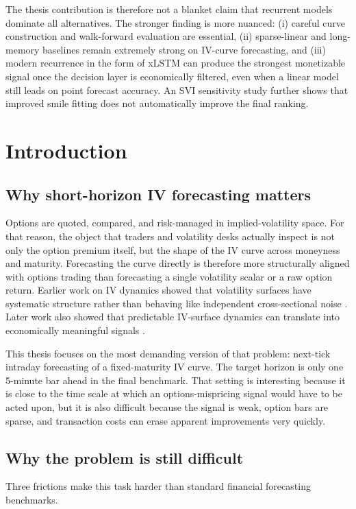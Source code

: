 \documentclass[12pt]{report}
\begin{document}
The thesis contribution is therefore not a blanket claim that recurrent models dominate all alternatives. The stronger finding is more nuanced: (i) careful curve construction and walk-forward evaluation are essential, (ii) sparse-linear and long-memory baselines remain extremely strong on IV-curve forecasting, and (iii) modern recurrence in the form of xLSTM can produce the strongest monetizable signal once the decision layer is economically filtered, even when a linear model still leads on point forecast accuracy. An SVI sensitivity study further shows that improved smile fitting does not automatically improve the final ranking.

\tableofcontents
\clearpage
{}
\hypersetup{pageanchor=true}

\chapter{Introduction}

\section{Why short-horizon IV forecasting matters}
Options are quoted, compared, and risk-managed in implied-volatility space. For that reason, the object that traders and volatility desks actually inspect is not only the option premium itself, but the shape of the IV curve across moneyness and maturity. Forecasting the curve directly is therefore more structurally aligned with options trading than forecasting a single volatility scalar or a raw option return. Earlier work on IV dynamics showed that volatility surfaces have systematic structure rather than behaving like independent cross-sectional noise \citep{cont2002dynamics}. Later work also showed that predictable IV-surface dynamics can translate into economically meaningful signals \citep{bernales2014,borochin2025}.

This thesis focuses on the most demanding version of that problem: next-tick intraday forecasting of a fixed-maturity IV curve. The target horizon is only one 5-minute bar ahead in the final benchmark. That setting is interesting because it is close to the time scale at which an options-mispricing signal would have to be acted upon, but it is also difficult because the signal is weak, option bars are sparse, and transaction costs can erase apparent improvements very quickly.

\section{Why the problem is still difficult}
Three frictions make this task harder than standard financial forecasting benchmarks.
\end{document}
